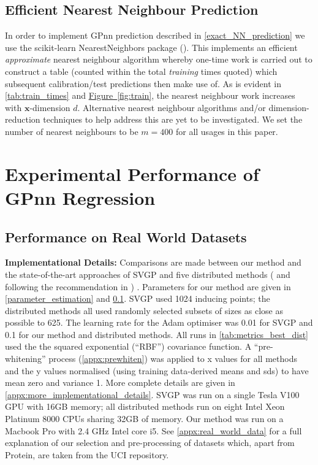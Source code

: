 \subsection{Efficient Nearest Neighbour Prediction}
\label{efficient_nn_prediction}
In order to implement GPnn prediction described in \ref{exact_NN_prediction} we use the scikit-learn NearestNeighbors package (\cite{scikit-learn}). This implements an efficient {\it approximate} nearest neighbour algorithm whereby one-time work is carried out to construct a table (counted within the total {\it training} times quoted) which subsequent calibration/test predictions then make use of. As is evident in \autoref{tab:train_times} and \hyperref[{fig:train}]{Figure~\ref*{fig:train}}, the nearest neighbour work increases with $\bm{x}$-dimension $d$. Alternative nearest neighbour algorithms and/or dimension-reduction techniques to help address this are yet to be investigated. We set the number of nearest neighbours to be $m = 400$ for all usages in this paper. 

\section{Experimental Performance of GPnn Regression}
\label{performance}

\subsection{Performance on Real World Datasets}
\label{real_world_data}
\textbf {Implementational Details:} Comparisons are made between our method and the state-of-the-art approaches of SVGP \cite{Hensman} and five distributed methods (\cite{hinton2002training,cao2014generalized,tresp2000bayesian,deisenroth2015distributed} and \cite{amalg_SOD} following the recommendation in \cite{Cohen20b}) . Parameters for our method are given in \ref{parameter_estimation} and \ref{efficient_nn_prediction}. SVGP used 1024 inducing points; the distributed methods all used randomly selected subsets of sizes as close as possible to 625. The learning rate for the Adam optimiser was 0.01 for SVGP and 0.1 for our method and distributed methods. All runs in \autoref{tab:metrics_best_dist} used the the squared exponential (``RBF'') covariance function. A ``pre-whitening'' process (\ref{appx:prewhiten}) was applied to x values for all methods and the y values normalised (using training data-derived means and sds)  to have mean zero and variance 1. More complete details are given in \ref{appx:more_implementational_details}. SVGP was run on a single Tesla V100 GPU with 16GB memory; all distributed methods run on eight Intel Xeon Platinum 8000 CPUs sharing 32GB of memory. Our method was run on a Macbook Pro with 2.4 GHz Intel core i5. See \ref{appx:real_world_data} for a full explanation of our selection and pre-processing of datasets which, apart from Protein, are taken from the UCI repository.

